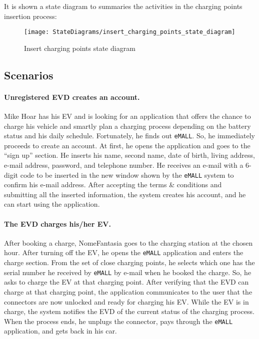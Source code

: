 It is shown a state diagram to summaries the activities in the charging points insertion process:
\begin{figure}[H]
    \begin{center}
        \texttt{[image: StateDiagrams/insert\_charging\_points\_state\_diagram]}
        \caption{Insert charging points state diagram}
        \label{fig:insert_charging_points_sd}%
    \end{center}
\end{figure}

\subsection{Scenarios}
\label{subsec:scenarios}%

\paragraph{Unregistered EVD creates an account.}
Mike Hoar has his EV and is looking for an application that offers the chance to charge his vehicle and smartly plan a
charging process depending on the battery status and his daily schedule.
Fortunately, he finds out \verb|eMALL|\@.
So, he immediately proceeds to create an account.
At first, he opens the application and goes to the ``sign up'' section.
He inserts his name, second name, date of birth, living address, e-mail address, password, and telephone number.
He receives an e-mail with a 6-digit code to be inserted in the new window shown by the \verb|eMALL| system to confirm his e-mail address.
After accepting the terms \& conditions and submitting all the inserted information, the system creates his account,
and he can start using the application.

\paragraph{The EVD charges his/her EV.}
After booking a charge, NomeFantasia goes to the charging station at the chosen hour.
After turning off the EV, he opens the \verb|eMALL| application and enters the charge section.
From the set of close charging points, he selects which one has the serial number he received by \verb|eMALL| by e-mail
when he booked the charge.
So, he asks to charge the EV at that charging point.
After verifying that the EVD can charge at that charging point, the application communicates to the user that the
connectors are now unlocked and ready for charging his EV\@.
While the EV is in charge, the system notifies the EVD of the current status of the charging process.
When the process ends, he unplugs the connector, pays through the \verb|eMALL| application, and gets back in his car.

